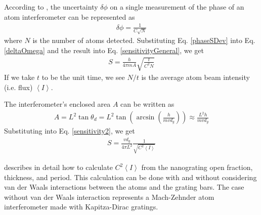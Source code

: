 \documentclass[twocolumn,pra,showpacs,superscriptaddress,longbibliography]{revtex4-1}   %
\newcommand{\avg}[1]{\left\langle #1 \right\rangle}
\begin{document}
According to \cite{Lenef1997}, the uncertainty $\delta\phi$ on a single measurement of the phase of an atom interferometer can be represented as
\begin{align}
	\delta\phi = \frac{1}{C\sqrt{N}}
	\label{phaseSDev}
\end{align}
where $N$ is the number of atoms detected.
Substituting Eq. \ref{phaseSDev} into Eq. \ref{deltaOmega} and the result into Eq. \ref{sensitivityGeneral}, we get 
\begin{align}
	S = \frac{h}{4\pi m A} \sqrt{\frac{t}{C^2N}}
	\label{sensitivity2}
\end{align}
If we take $t$ to be the unit time, we see $N/t$ is the average atom beam intensity (i.e. flux) $\avg{I}$.

The interferometer's enclosed area $A$ can be written as
\begin{align}
	A = L^2\tan{\theta_d} = L^2\tan\left(\arcsin\left(\frac{h}{mvd_g}\right)\right) \approx \frac{L^2h}{mvd_g}
\end{align}
Substituting into Eq. \ref{sensitivity2}, we get
\begin{align}
	S = \frac{vd_g}{4\pi L^2} \frac{1}{ \sqrt{C^2\avg{I}}}
	\label{sensitivity3}
\end{align}


\cite{Cronin2005} describes in detail how to calculate $C^2\avg{I}$ from the nanograting open fraction, thickness, and period. This calculation can be done with and without considering van der Waals interactions between the atoms and the grating bars. The case without van der Waals interaction represents a Mach-Zehnder atom interferometer made with Kapitza-Dirac gratings.


\end{document}
